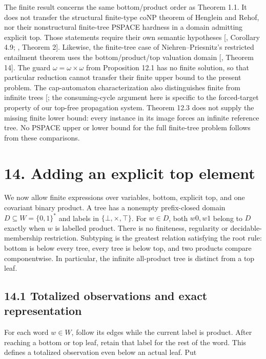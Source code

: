 \documentclass[
  11pt,
  a4paper,
]{article}
\newcounter{none} %
\begin{document}
The finite result concerns the same bottom/product order as Theorem 1.1.
It does not transfer the structural finite-type coNP theorem of Henglein
and Rehof, nor their nonstructural finite-tree PSPACE hardness in a
domain admitting explicit top. Those statements require their own
semantic hypotheses {[}, Corollary 4.9;
, Theorem 2{]}. Likewise, the finite-tree case of
Niehren--Priesnitz's restricted entailment theorem uses the
bottom/product/top valuation domain {[}, Theorem
14{]}. The guard \(\omega=\omega\times\omega\) from Proposition 12.1 has
no finite solution, so that particular reduction cannot transfer their
finite upper bound to the present problem. The cap-automaton
characterization also distinguishes finite from infinite trees
{[}\citeproc{ref-NP03}{3}{]}; the consuming-cycle argument here is
specific to the forced-target property of our top-free propagation
system. Theorem 12.3 does not supply the missing finite lower bound:
every instance in its image forces an infinite reference tree. No PSPACE
upper or lower bound for the full finite-tree problem follows from these
comparisons.


\section{14. Adding an explicit top
element}\label{adding-an-explicit-top-element}

We now allow finite expressions over variables, bottom, explicit top,
and one covariant binary product. A tree has a nonempty prefix-closed
domain \(D\subseteq W=\{0,1\}^*\) and labels in
\(\{\bot,\times,\top\}\). For \(w\in D\), both \(w0,w1\) belong to \(D\)
exactly when \(w\) is labelled product. There is no finiteness,
regularity or decidable-membership restriction. Subtyping is the
greatest relation satisfying the root rule: bottom is below every tree,
every tree is below top, and two products compare componentwise. In
particular, the infinite all-product tree is distinct from a top leaf.

\subsection{14.1 Totalized observations and exact
representation}\label{totalized-observations-and-exact-representation}

For each word \(w\in W\), follow its edges while the current label is
product. After reaching a bottom or top leaf, retain that label for the
rest of the word. This defines a totalized observation even below an
actual leaf. Put
\end{document}

